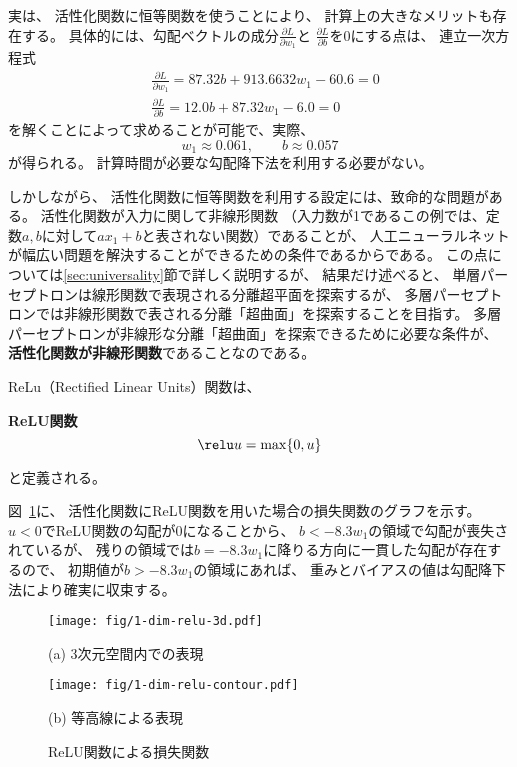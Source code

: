 実は、
活性化関数に恒等関数を使うことにより、
計算上の大きなメリットも存在する。
具体的には、勾配ベクトルの成分$\frac{\partial L}{\partial w_1}$と
$\frac{\partial L}{\partial b}$を0にする点は、
連立一次方程式
\begin{align*}
  &
    \frac{\partial L}{\partial w_1} =
    87.32 b + 913.6632 w_1 - 60.6 = 0
  \\&
  \frac{\partial L}{\partial b} =
  12.0 b + 87.32 w_1 - 6.0 = 0
\end{align*}
を解くことによって求めることが可能で、実際、
\[
  w_1 \approx 0.061, \qquad b \approx 0.057
\]
が得られる。
計算時間が必要な勾配降下法を利用する必要がない。

しかしながら、
活性化関数に恒等関数を利用する設定には、致命的な問題がある。
活性化関数が入力に関して非線形関数
（入力数が1であるこの例では、定数$a, b$に対して$ax_1 + b$と表されない関数）であることが、
人工ニューラルネットが幅広い問題を解決することができるための条件であるからである。
この点については\ref{sec:universality}節で詳しく説明するが、
結果だけ述べると、
単層パーセプトロンは線形関数で表現される分離超平面を探索するが、
多層パーセプトロンでは非線形関数で表される分離「超曲面」を探索することを目指す。
多層パーセプトロンが非線形な分離「超曲面」を探索できるために必要な条件が、
\textbf{活性化関数が非線形関数}であることなのである。

ReLu（Rectified Linear Units）関数は、
\begin{itembox}{\bf ReLU関数}
\[
  \relu u = \max \{0, u\}
\]
\end{itembox}
と定義される。

図~\ref{fig:relu-weight-bias}に、
活性化関数にReLU関数を用いた場合の損失関数のグラフを示す。
$u < 0$でReLU関数の勾配が0になることから、
$b < -8.3 w_1$の領域で勾配が喪失されているが、
残りの領域では$b = -8.3w_1$に降りる方向に一貫した勾配が存在するので、
初期値が$b > -8.3w_1$の領域にあれば、
重みとバイアスの値は勾配降下法により確実に収束する。

\begin{figure}
  \centering
    \texttt{[image: fig/1-dim-relu-3d.pdf]}

    (a) 3次元空間内での表現
    \vspace{5mm}

    \texttt{[image: fig/1-dim-relu-contour.pdf]}
    
    (b) 等高線による表現

  \caption{ReLU関数による損失関数}
\label{fig:relu-weight-bias}
\end{figure}

